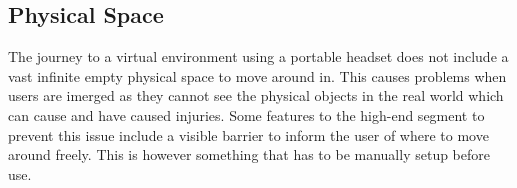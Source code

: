 \subsection{Physical Space}
The journey to a virtual environment using a portable headset does not include a vast infinite empty physical space to move around in. This causes problems when users are imerged as they cannot see the physical objects in the real world which can cause and have caused injuries\cite{VR_injuries:2_allen_2017,VR_injuries:steamed}. Some features to the high-end segment to prevent this issue include a visible barrier to inform the user of where to move around freely. This is however something that has to be manually setup before use.\cite{VR_injuries:6_machkovech_2017}
